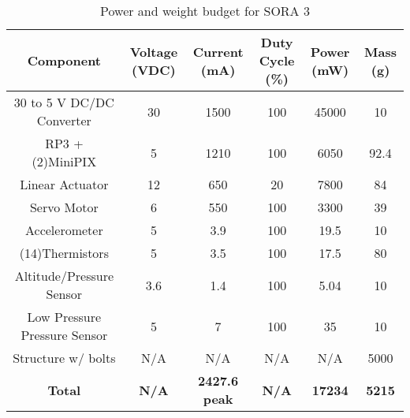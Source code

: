 \begin{table}[H]
  \centering
  \caption{Power and weight budget for SORA 3} 
  \label{tab:budget}
  \bigskip
  \begin{tabular}{cccccc}
    \hline
    \hline
    \multicolumn{1}{c}{\bfseries Component} & \multicolumn{1}{c}{\bfseries Voltage (VDC)} &  \multicolumn{1}{c}{\bfseries Current (mA)} & \multicolumn{1}{c}{\bfseries Duty Cycle (\%)} & \multicolumn{1}{c}{\bfseries Power (mW)} & \multicolumn{1}{c}{\bfseries Mass (g)} \\
    \hline
    30 to 5 V DC/DC Converter & 30 & 1500 & 100 & 45000 & 10 \\
    RP3 + (2)MiniPIX & 5 & 1210 & 100 & 6050 & 92.4 \\    
    Linear Actuator & 12 & 650 & 20 & 7800 & 84 \\
    Servo Motor & 6 & 550 & 100 & 3300 & 39 \\
    Accelerometer & 5 & 3.9 & 100 & 19.5 & 10 \\
    (14)Thermistors & 5 & 3.5 & 100 & 17.5 & 80 \\
    Altitude/Pressure Sensor & 3.6 & 1.4 & 100 & 5.04 & 10 \\
    Low Pressure Pressure Sensor & 5 & 7 & 100 & 35 & 10 \\   
    
    
    Structure w/ bolts & N/A & N/A & N/A & N/A & 5000 \\
    \hline
    \textbf{Total} & \textbf{N/A} & \textbf{2427.6 peak} & \textbf{N/A} & \textbf{17234} & \textbf{5215} \\
    \hline
    \hline
  \end{tabular}
  \medskip
\end{table}
